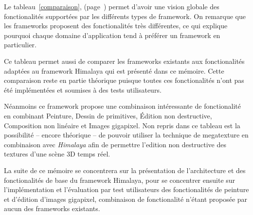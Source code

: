 	Le tableau~\ref{comparaison}, (page~\pageref{comparaison}) permet d'avoir une vision globale des fonctionalités supportées par les différents 
	types de framework. On remarque que les frameworks proposent des fonctionalités très différentes, ce qui explique pourquoi chaque 
	domaine d'application tend à préférer un framework en particulier.

	Ce tableau permet aussi de comparer les frameworks existants aux fonctionalités adaptées au framework Himalaya qui est présenté dans ce mémoire. Cette
	comparaison reste en partie théorique puisque toutes ces fonctionalités n'ont pas été implémentées et soumises à des tests utilisateurs. 
	
	Néanmoins ce framework propose une combinaison intéressante de fonctionalité en combinant Peinture, Dessin de primitives, Édition non destructive, 
	Composition non linéaire et Images gigapixel. Non repris dans ce tableau est la possibilité -- encore théorique -- de pouvoir utiliser la technique
	de megatexture en combinaison avec \emph{Himalaya} afin de permettre l'edition non destructive des textures d'une scène 3D temps réel.

	La suite de ce mémoire se concentrera sur la présentation de l'architecture et des fonctionalités de base du framework Himalaya, pour se concentrer
	ensuite sur l'implémentation et l'évaluation par test utilisateurs des fonctionalités de peinture et d'édition d'images gigapixel, combinaison de
	fonctionalité n'étant proposée par aucun des frameworks existants.

